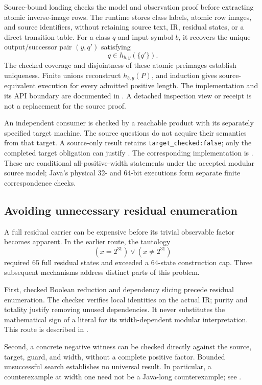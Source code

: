 Source-bound loading checks the model and observation proof before extracting atomic inverse-image rows. The runtime stores class labels, atomic row images, and source identifiers, without retaining source text, IR, residual states, or a direct transition table. For a class $q$ and input symbol $b$, it recovers the unique output/successor pair $(y,q')$ satisfying
\[
 q\in h_{b,y}(\{q'\}).
\]
The checked coverage and disjointness of these atomic preimages establish uniqueness. Finite unions reconstruct $h_{b,y}(P)$, and induction gives source-equivalent execution for every admitted positive length. The implementation and its API boundary are documented in . A detached inspection view or receipt is not a replacement for the source proof.

An independent consumer is checked by a reachable product with its separately specified target machine. The source questions do not acquire their semantics from that target. A source-only result retains \texttt{target\_checked:false}; only the completed target obligation can justify \certified. The corresponding implementation is . These are conditional all-positive-width statements under the accepted modular source model; Java's physical 32- and 64-bit executions form separate finite correspondence checks.

\subsection{Avoiding unnecessary residual enumeration}
A full residual carrier can be expensive before its trivial observable factor becomes apparent. In the earlier route, the tautology
\[
 (x=2^{31})\lor(x\ne2^{31})
\]
required 65 full residual states and exceeded a 64-state construction cap. Three subsequent mechanisms address distinct parts of this problem.

First, checked Boolean reduction and dependency slicing precede residual enumeration. The checker verifies local identities on the actual IR; purity and totality justify removing unused dependencies. It never substitutes the mathematical sign of a literal for its width-dependent modular interpretation. This route is described in .

Second, a concrete negative witness can be checked directly against the source, target, guard, and width, without a complete positive factor. Bounded unsuccessful search establishes no universal result. In particular, a counterexample at width one need not be a Java-long counterexample; see .

